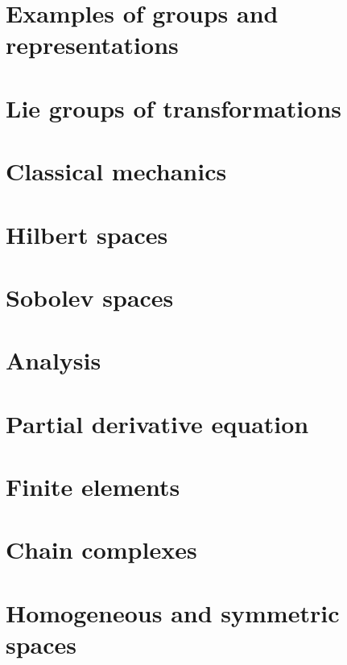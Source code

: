 \chapter{Examples of groups and representations}        \label{ChapThoComsGroupes}



\chapter{Lie groups of transformations}


\chapter{Classical mechanics}


\chapter{Hilbert spaces}



\chapter{Sobolev spaces}


\chapter{Analysis}




\chapter{Partial derivative equation}


\chapter{Finite elements}


\chapter{Chain complexes}


\chapter{Homogeneous and symmetric spaces}




